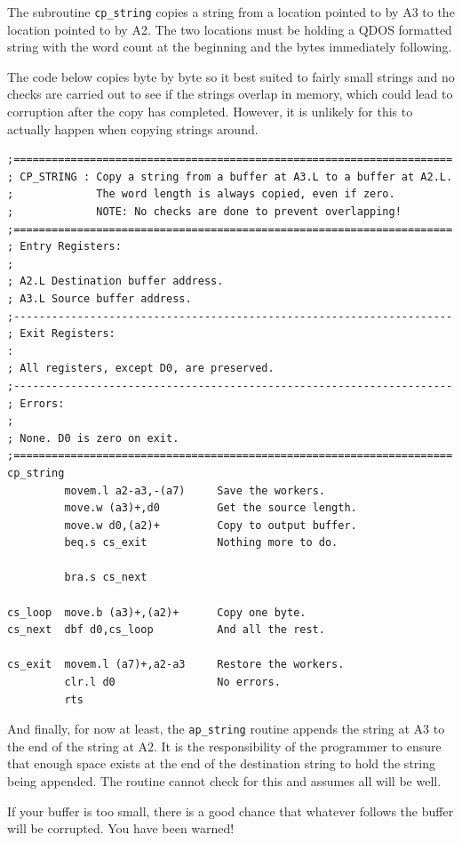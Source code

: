 The subroutine \texttt{cp\_string} copies a string from a
    location pointed to by A3 to the location pointed to by A2. The two
    locations must be holding a QDOS formatted string with the word count at
    the beginning and the bytes immediately following.

The code below copies byte by byte so it best suited to fairly small
    strings and no checks are carried out to see if the strings overlap in
    memory, which could lead to corruption after the copy has completed.
    However, it is unlikely for this to actually happen when copying strings
    around.

\begin{lstlisting}[firstnumber=1,]
;=====================================================================
; CP_STRING : Copy a string from a buffer at A3.L to a buffer at A2.L.
;             The word length is always copied, even if zero.
;             NOTE: No checks are done to prevent overlapping!
;=====================================================================
; Entry Registers:
;
; A2.L Destination buffer address.
; A3.L Source buffer address.
;---------------------------------------------------------------------
; Exit Registers:
:
; All registers, except D0, are preserved.
;---------------------------------------------------------------------
; Errors:
;
; None. D0 is zero on exit.
;=====================================================================
cp_string
         movem.l a2-a3,-(a7)     Save the workers.
         move.w (a3)+,d0         Get the source length.
         move.w d0,(a2)+         Copy to output buffer.
         beq.s cs_exit           Nothing more to do.

         bra.s cs_next

cs_loop  move.b (a3)+,(a2)+      Copy one byte.
cs_next  dbf d0,cs_loop          And all the rest.

cs_exit  movem.l (a7)+,a2-a3     Restore the workers.
         clr.l d0                No errors.
         rts
\end{lstlisting}

And finally, for now at least, the \texttt{ap\_string}     routine appends the string at A3 to the end of the string at A2. It is the
    responsibility of the programmer to ensure that enough space exists at the
    end of the destination string to hold the string being appended. The
    routine cannot check for this and assumes all will be well.

If your buffer is too small, there is a good chance that whatever
    follows the buffer will be corrupted. You have been warned!

